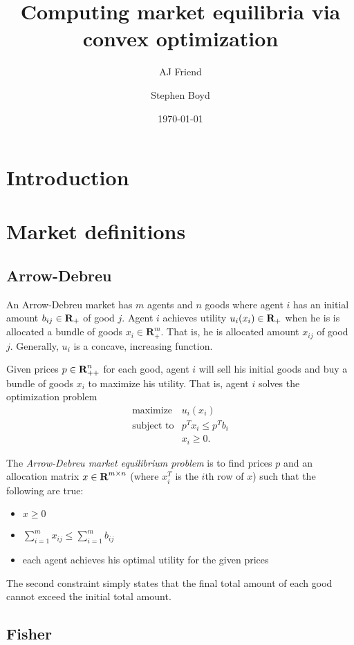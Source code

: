 \documentclass{article}
\title{Computing market equilibria via convex optimization}
\author{AJ Friend \and Stephen Boyd}
\date{\today}
\begin{document}
\maketitle

\section{Introduction}

\section{Market definitions}
\subsection{Arrow-Debreu}

An Arrow-Debreu market has $m$ agents and $n$ goods where
agent $i$ has an initial amount $b_{ij} \in {\mbox{\bf R}}_+$ of good $j$.
Agent $i$ achieves utility $u_i(x_i) \in {\mbox{\bf R}}_+$ when he is is allocated a bundle of goods $x_i \in \mathbf{R}^m_{+}$. That is, he is allocated amount $x_{ij}$ of good $j$.
Generally, $u_i$ is a concave, increasing function.

Given prices $p \in {\mbox{\bf R}}^n_{++}$ for each good, agent $i$ will sell his initial goods and buy a bundle of goods $x_i$ to maximize his utility. That is, agent $i$ solves the optimization problem
\[
\begin{array}{ll}
\mbox{maximize} & u_i(x_i) \\
\mbox{subject to} & p^T x_i \leq p^T b_i \\
& x_i \geq 0.
\end{array}
\]

The \emph{Arrow-Debreu market equilibrium problem} is to find prices $p$ and an allocation matrix $x \in {\mbox{\bf R}}^{m \times n}$ (where $x_i^T$ is the $i$th row of $x$) such that the following are true:
\begin{itemize}
\item $x \geq 0$
\item $\sum_{i=1}^m x_{ij} \leq \sum_{i=1}^m b_{ij}$
\item each agent achieves his optimal utility for the given prices
\end{itemize}

The second constraint simply states that the final total amount of each good cannot exceed the initial total amount.

\subsection{Fisher}
\end{document}
